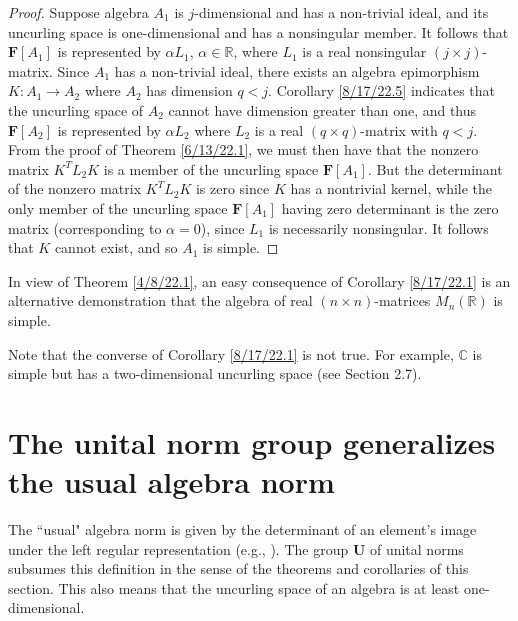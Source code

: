 \documentclass{amsart}
\numberwithin{equation}{section}
\theoremstyle{definition}
\numberwithin{theorem}{section}
\begin{document}
\begin{proof} Suppose algebra $A_1$ is $j$-dimensional and has a non-trivial ideal, and its uncurling space is one-dimensional and has a nonsingular member.  It follows that $\mathbf{F}[A_1]$ is represented by  $\alpha L_1$, $\alpha\in \mathbb{R}$, where $L_1$ is a real nonsingular $(j\times j)$-matrix.  Since $A_1$ has a non-trivial ideal, there exists an algebra epimorphism $K:A_1\rightarrow A_2$ where $A_2$ has dimension $q<j$.  Corollary \ref{8/17/22.5} indicates that the uncurling space of $A_2$ cannot have dimension greater than one, and thus $\mathbf{F}[A_2]$ is represented by $\alpha L_2$ where $L_2$ is a real $(q\times q)$-matrix with $q<j$. From the proof of Theorem \ref{6/13/22.1}, we must then have that the nonzero matrix $ K^T L_2 K$ is a member of the uncurling space $\mathbf{F}[A_1]$.  But the determinant of the nonzero matrix $ K^T L_2 K$ is zero since $K$ has a nontrivial kernel, while the only member of the uncurling space $\mathbf{F}[A_1]$ having zero determinant is the zero matrix (corresponding to $\alpha=0$), since $L_1$ is necessarily nonsingular.   It follows that $K$ cannot exist, and so $A_1$ is simple. \end{proof}

\enlargethispage{1cm}
In view of Theorem \ref{4/8/22.1}, an easy consequence of Corollary \ref{8/17/22.1} is an alternative demonstration that the algebra of real $(n\times n)$-matrices $ M_n(\mathbb{R})$ is simple.  

Note that the converse of Corollary \ref{8/17/22.1} is not true.  For example, $\mathbb{C}$ is simple but has a two-dimensional uncurling space (see Section 2.7).


\section{The unital norm group generalizes the usual algebra norm} 

The ``usual" algebra norm is given by the determinant of an element's image under the left regular representation (e.g., \cite{bourbaki:1989}).  The group $\mathbf{U}$ of unital norms subsumes this definition in the sense of the theorems and corollaries of this section.  This also means that the uncurling space of an algebra is at least one-dimensional.
\end{document}
